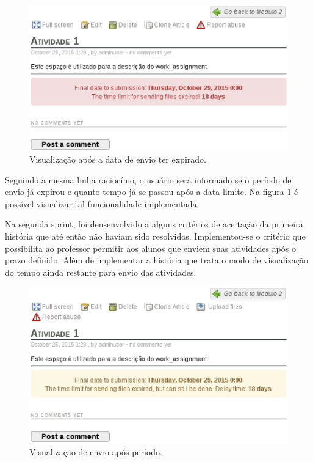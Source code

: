 \begin{figure}[h]
    \centering
    \includegraphics[keepaspectratio=true,scale=0.7]
      {figuras/work-expired.eps}
    \caption{Visualização após a data de envio ter expirado.}
    \label{fig:work-expired}
\end{figure}

Seguindo a mesma linha raciocínio, o usuário será informado se o período de envio já expirou e quanto tempo já se passou após a data limite. Na figura \ref{fig:work-expired} é possível visualizar tal funcionalidade implementada.

Na segunda sprint, foi densenvolvido a alguns critérios de aceitação da primeira história que até então não haviam sido resolvidos. Implementou-se o critério que possibilita ao professor permitir aos alunos que enviem suas atividades após o prazo definido. Além de implementar a história que trata o modo de visualização do tempo ainda restante para envio das atividades.

\begin{figure}[h]
    \centering
    \includegraphics[keepaspectratio=true,scale=0.7]
      {figuras/work-allowed.eps}
    \caption{Visualização de envio após período.}
    \label{fig:work-allowed}
\end{figure}

